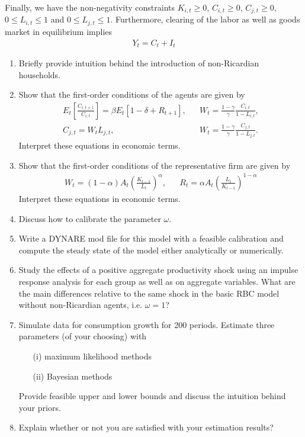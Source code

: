 \documentclass[a4paper]{scrartcl}
\begin{document}
    Finally, we have the non-negativity constraints	$K_{i,t} \geq0$, $C_{i,t} \geq 0$, $C_{j,t} \geq 0$, $0\leq L_{i,t} \leq 1$ and $0\leq L_{j,t} \leq 1$. Furthermore, clearing of the labor as well as goods market in equilibrium implies
    \begin{align*}
        Y_t = C_t + I_t
    \end{align*}
    
    \begin{enumerate}
        \item Briefly provide intuition behind the introduction of non-Ricardian households.
        \item Show that the first-order conditions of the agents are given by
              \begin{align*}
                  E_t\left[\frac{C_{i,t+1}}{C_{i,t}}\right] = \beta E_t\left[1-\delta + R_{t+1}\right], &  & 
                  W_t = \frac{1-\gamma}{\gamma} \frac{C_{i,t}}{1-L_{i,t}},                                    \\
                  C_{j,t} = W_t L_{j,t},                                                                &  & 
                  W_t = \frac{1-\gamma}{\gamma} \frac{C_{j,t}}{1-L_{j,t}}.
              \end{align*}
              Interpret these equations in economic terms.
              
        \item Show that the first-order conditions of the representative firm are given by
              \begin{align*}
                  W_t = (1-\alpha) A_t \left(\frac{K_{t-1}}{L_t}\right)^\alpha, &  & R_t = \alpha A_t \left(\frac{L_t}{K_{t-1}}\right)^{1-\alpha}
              \end{align*}
              Interpret these equations in economic terms.
        \item Discuss how to calibrate the parameter $\omega$.
        \item Write a DYNARE mod file for this model with a feasible calibration and compute the steady state of the model either analytically or numerically.
        \item Study the effects of a positive aggregate productivity shock using an impulse response analysis for each group as well as on aggregate variables. What are the main differences relative to the same shock in the basic RBC model without non-Ricardian agents, i.e. $\omega=1$?
        \item Simulate data for consumption growth for 200 periods. Estimate three parameters (of your choosing) with
              \begin{itemize}
                  \item[(i)] maximum likelihood methods
                  \item[(ii)] Bayesian methods
              \end{itemize}
              Provide feasible upper and lower bounds and discuss the intuition behind your priors. 
        \item Explain whether or not you are satisfied with your estimation results?
    \end{enumerate}
    \newpage
    
\end{document}
